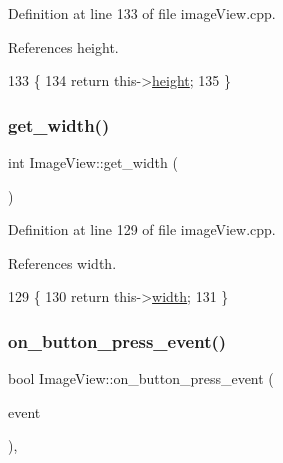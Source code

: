 Definition at line 133 of file image\+View.\+cpp.



References height.


\begin{DoxyCode}
133                           \{
134     \textcolor{keywordflow}{return} this->\hyperlink{class_image_view_a3e4a6ddf0a10ae710405cdd6e73924f6}{height};
135 \}
\end{DoxyCode}
\mbox{\label{class_image_view_a2bbc02fd7818b11ef0caa13f95ac300c}} 
\subsubsection{\texorpdfstring{get\+\_\+width()}{get\_width()}}
{\footnotesize\ttfamily int Image\+View\+::get\+\_\+width (\begin{DoxyParamCaption}{ }\end{DoxyParamCaption})}



Definition at line 129 of file image\+View.\+cpp.



References width.


\begin{DoxyCode}
129                          \{
130     \textcolor{keywordflow}{return} this->\hyperlink{class_image_view_a5a491c5256173430d4b16d9abea80727}{width};
131 \}
\end{DoxyCode}
\mbox{\label{class_image_view_ab7d917a1282ba8cdd902d49a4cd0d0cc}} 
\subsubsection{\texorpdfstring{on\+\_\+button\+\_\+press\+\_\+event()}{on\_button\_press\_event()}}
{\footnotesize\ttfamily bool Image\+View\+::on\+\_\+button\+\_\+press\+\_\+event (\begin{DoxyParamCaption}\item[{Gdk\+Event\+Button $\ast$}]{event }\end{DoxyParamCaption})\hspace{0.3cm}{\ttfamily [private]}, {\ttfamily [virtual]}}



